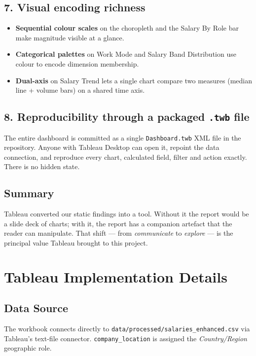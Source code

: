 \documentclass[11pt,a4paper,oneside]{report}
\begin{document}
\section{7. Visual encoding richness}
\begin{itemize}[leftmargin=*]
    \item \textbf{Sequential colour scales} on the choropleth and the Salary By Role bar make magnitude visible at a glance.
    \item \textbf{Categorical palettes} on Work Mode and Salary Band Distribution use colour to encode dimension membership.
    \item \textbf{Dual-axis} on Salary Trend lets a single chart compare two measures (median line + volume bars) on a shared time axis.
\end{itemize}

\section{8. Reproducibility through a packaged \texttt{.twb} file}
The entire dashboard is committed as a single \texttt{Dashboard.twb} XML file in the repository. Anyone with Tableau Desktop can open it, repoint the data connection, and reproduce every chart, calculated field, filter and action exactly. There is no hidden state.

\section{Summary}
Tableau converted our static findings into a tool. Without it the report would be a slide deck of charts; with it, the report has a companion artefact that the reader can manipulate. That shift --- from \textit{communicate} to \textit{explore} --- is the principal value Tableau brought to this project.

\chapter{Tableau Implementation Details}

\section{Data Source}
The workbook connects directly to \texttt{data/processed/salaries\_enhanced.csv} via Tableau's text-file connector. \texttt{company\_location} is assigned the \textit{Country/Region} geographic role.
\end{document}
